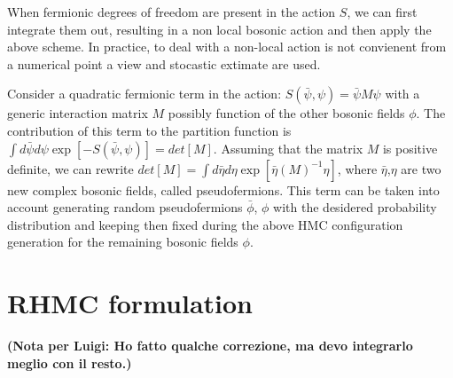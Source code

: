 \documentclass{article}[12pt]
\begin{document}
When fermionic degrees of freedom are present in the action $S$, we can first integrate them out, resulting in a non
local bosonic action and then apply the above scheme. In practice, to deal with a non-local action is not convienent
from a numerical point a view and stocastic extimate are used.

Consider a quadratic fermionic term  in the action: $S(\bar\psi,\psi) = \bar\psi M \psi$ with a generic interaction
matrix $M$ possibly function of the other bosonic fields $\phi$. The contribution of this term to the partition function
is $\int d\bar\psi d\psi \exp [ -S(\bar\psi,\psi)] = det[M]$. Assuming that the matrix $M$ is positive definite,
we can rewrite $det[M]=\int d\bar\eta d\eta \exp[ \bar\eta (M)^{-1} \eta ]$, where $\bar\eta$,$\eta$ are two new 
complex bosonic fields, called pseudofermions.
This term can be taken into account generating random pseudofermions $\bar\phi$, $\phi$ with the desidered probability
distribution and keeping then fixed during the above HMC configuration generation for the remaining bosonic fields $\phi$.



\section{RHMC formulation}
\noindent\textbf{(Nota per Luigi: Ho fatto qualche correzione, ma devo integrarlo meglio con il resto.)}
\end{document}
